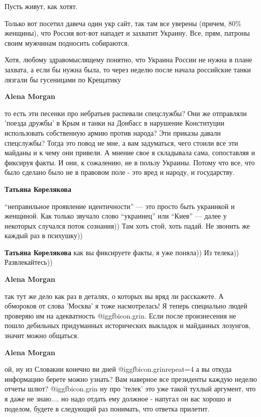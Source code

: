 \begin{itemize}
\begin{itemize}
Пусть живут, как хотят.

Только вот посетил давеча один укр сайт, так там все уверены (причем, 80\%
женщины), что Россия вот-вот нападет и захватит Украину. Все, прям, патроны
своим мужчинам подносить собираются.

Хотя, любому здравомыслящему понятно, что Украина России не нужна в плане
захвата, а если бы нужна была, то через неделю после начала российские танки
лязгали бы гусеницами по Крещатику

\textbf{Alena Morgan} 

то есть эти песенки про небратьев распевали спецслужбы? Они же отправляли
'поезда дружбы' в Крым и танки на Донбасс в нарушение Конституции использовать
собственную армию против народа? Эти приказы давали спецслужбы? Тогда это повод
не мне, а вам задуматься, чего стоили все эти майданы и к чему они привели. А
мнение свое я складывала сама, сопоставляя и фиксируя факты. И они, к
сожалению, не в пользу Украины. Потому что все, что было сделано было не в
правовом поле - это вред и народу, и государству.

\textbf{Татьяна Корелякова} 

\enquote{неправильное проявление идентичности} — это просто быть украинкой и женщиной.
Как только звучало слово \enquote{украинец} или \enquote{Киев} — далее у некоторых случался
поток сознания)) Там хоть стой, хоть падай. Не звонить же каждый раз в
психушку))


\textbf{Татьяна Корелякова} как вы фиксируете факты, я уже поняла)) Из телека)) Развлекайтесь))

\textbf{Alena Morgan} 

так тут же дело как раз в деталях, о которых вы вряд ли расскажете. А обмороков
от слова 'Москва' я тоже насмотрелась! Я теперь специально людей проверяю им на
адекватность  @igg{fbicon.grin}. Если после произнесения не пошло дебильных придуманных
исторических выкладок и майданных лозунгов, значит можно общаться.

\textbf{Alena Morgan} 

ой, ну из Словакии конечно ви дней  @igg{fbicon.grin}{repeat=4} а вы откуда информацию берете можно
узнать? Вам наверное все президенты каждую неделю отчеты шлют?  @igg{fbicon.grin}  ну про
'телек' это уже такой тухлый аргумент, что я даже не знаю.... но надо отдать ему
должное - напугал он вас хорошо и поделом, будете в следующий раз понимать, что
ответка прилетит.


\end{itemize}
\end{itemize}
